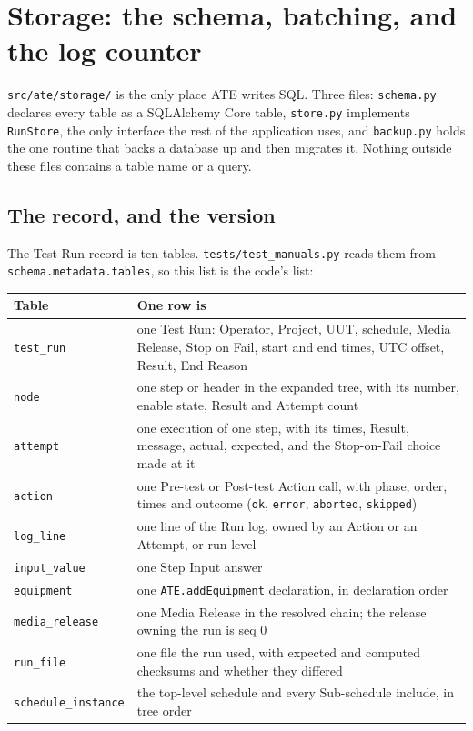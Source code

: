 \chapter{Storage: the schema, batching, and the log counter}\label{ch:storage}

\texttt{src/ate/storage/} is the only place ATE writes SQL. Three files: \texttt{schema.py} declares
every table as a SQLAlchemy Core table, \texttt{store.py} implements \texttt{RunStore}, the only
interface the rest of the application uses, and \texttt{backup.py} holds the one routine that backs a
database up and then migrates it. Nothing outside these files contains a table name or a query.

\section{The record, and the version}

The Test Run record is ten tables. \texttt{tests/\allowbreak{}test\_\allowbreak{}manuals.py} reads them from
\texttt{schema.metadata.tables}, so this list is the code's list:

\begingroup\small
\begin{longtable}{p{3.2cm} p{8.4cm}}
\toprule
\textbf{Table} & \textbf{One row is} \\
\midrule
\endhead
\texttt{test\_run} & one Test Run: Operator, Project, UUT, schedule, Media Release, Stop on Fail, start
  and end times, UTC offset, Result, End Reason \\
\texttt{node} & one step or header in the expanded tree, with its number, enable state, Result and
  Attempt count \\
\texttt{attempt} & one execution of one step, with its times, Result, message, actual, expected, and the
  Stop-on-Fail choice made at it \\
\texttt{action} & one Pre-test or Post-test Action call, with phase, order, times and outcome
  (\texttt{ok}, \texttt{error}, \texttt{aborted}, \texttt{skipped}) \\
\texttt{log\_line} & one line of the Run log, owned by an Action or an Attempt, or run-level \\
\texttt{input\_value} & one Step Input answer \\
\texttt{equipment} & one \texttt{ATE.addEquipment} declaration, in declaration order \\
\texttt{media\_release} & one Media Release in the resolved chain; the release owning the run is seq 0 \\
\texttt{run\_file} & one file the run used, with expected and computed checksums and whether they differed \\
\texttt{schedule\_instance} & the top-level schedule and every Sub-schedule include, in tree order \\
\bottomrule
\end{longtable}
\endgroup

